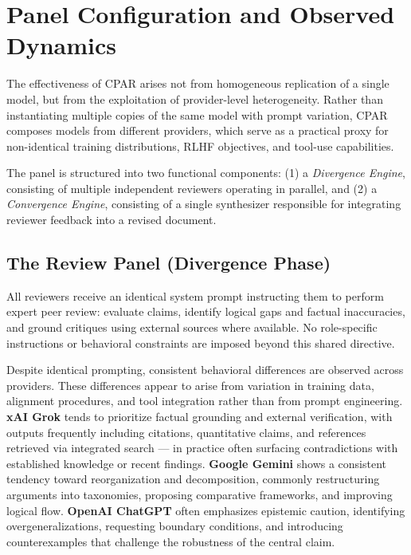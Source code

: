 \documentclass[11pt, a4paper]{article}
\begin{document}
\section{Panel Configuration and Observed Dynamics}
\label{sec:panel}

The effectiveness of CPAR arises not from homogeneous replication of a single model, but from the exploitation of provider-level heterogeneity. Rather than instantiating multiple copies of the same model with prompt variation, CPAR composes models from different providers, which serve as a practical proxy for non-identical training distributions, RLHF objectives, and tool-use capabilities.

The panel is structured into two functional components: (1) a \textit{Divergence Engine}, consisting of multiple independent reviewers operating in parallel, and (2) a \textit{Convergence Engine}, consisting of a single synthesizer responsible for integrating reviewer feedback into a revised document.

\subsection{The Review Panel (Divergence Phase)}

All reviewers receive an identical system prompt instructing them to perform expert peer review: evaluate claims, identify logical gaps and factual inaccuracies, and ground critiques using external sources where available. No role-specific instructions or behavioral constraints are imposed beyond this shared directive.

Despite identical prompting, consistent behavioral differences are observed across providers. These differences appear to arise from variation in training data, alignment procedures, and tool integration rather than from prompt engineering. \textbf{xAI Grok} tends to prioritize factual grounding and external verification, with outputs frequently including citations, quantitative claims, and references retrieved via integrated search --- in practice often surfacing contradictions with established knowledge or recent findings. \textbf{Google Gemini} shows a consistent tendency toward reorganization and decomposition, commonly restructuring arguments into taxonomies, proposing comparative frameworks, and improving logical flow. \textbf{OpenAI ChatGPT} often emphasizes epistemic caution, identifying overgeneralizations, requesting boundary conditions, and introducing counterexamples that challenge the robustness of the central claim.
\end{document}
